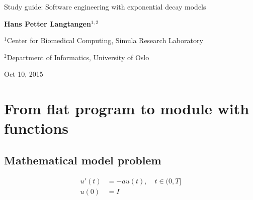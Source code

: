 \documentclass[%
oneside,                 %
final,                   %
10pt]{article}
\begin{document}







\thispagestyle{empty}

\begin{center}
{\LARGE\bf
\begin{spacing}{1.25}
Study guide: Software engineering with exponential decay models
\end{spacing}
}
\end{center}


\begin{center}
{\bf Hans Petter Langtangen${}^{1, 2}$} \\ [0mm]
\end{center}

\begin{center}
\centerline{{\small ${}^1$Center for Biomedical Computing, Simula Research Laboratory}}
\centerline{{\small ${}^2$Department of Informatics, University of Oslo}}
\end{center}
    

\begin{center}
Oct 10, 2015
\end{center}

\vspace{1cm}


\section*{From flat program to module with functions}

\subsection*{Mathematical model problem}

\begin{align*}
u'(t) &= -au(t), \quad t \in (0,T]\\ 
u(0)  &= I
\end{align*}
\end{document}
